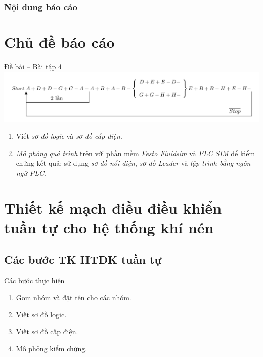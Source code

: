 \documentclass[24pt]{beamer}
\begin{document}
\begin{frame}
	\frametitle{Nội dung báo cáo}
	\tableofcontents
\end{frame}
\section{Chủ đề báo cáo}
\begin{frame}{Đề bài -- Bài tập 4}
	\vspace{-.5cm}
	\hspace{-1cm}\includegraphics[scale=0.7]{draw-tikz/quatrinh-bt4.pdf}
	
	\begin{footnotesize}
		\begin{enumerate}
			\justifying
			\item Viết \emph{sơ đồ logic} và \emph{sơ đồ cấp điện}.
			\item \emph{Mô phỏng quá trình} trên với phần mềm  \emph{Festo Fluidsim} và \emph{PLC SIM} để kiểm chứng kết quả: sử dụng \emph{sơ đồ nối điện}, \emph{sơ đồ Leader} và \emph{lập trình bằng ngôn ngữ PLC}.
		\end{enumerate}
	\end{footnotesize}
\end{frame}

\section[Thiết kế mạch điều khiển ]{Thiết kế mạch điều điều khiển tuần tự cho hệ thống khí nén}
\subsection*{Các bước TK HTĐK tuần tự}
\begin{frame}{Các bước thực hiện}
	\begin{enumerate}
		\justifying
		\item Gom nhóm và đặt tên cho các nhóm.
		
		\item Viết sơ đồ logic.
		
		\item Viết sơ đồ cấp điện.
		
		\item Mô phỏng kiểm chứng.
	\end{enumerate}
\end{frame}
\end{document}
